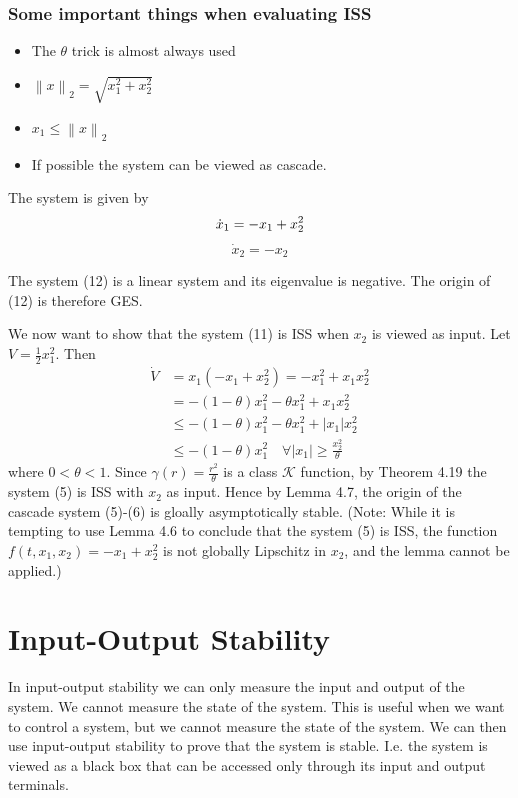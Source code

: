 \documentclass{article}
\begin{document}
\subsubsection{Some important things when evaluating ISS}
\begin{itemize}
	\item The $\theta $ trick is almost always used
	\item $\left\| x \right\|_2 = \sqrt{x_1^{2}+x_2^{2}}$
	\item $x_1 \leq \left\| x \right\|_2$
	\item If possible the system can be viewed as cascade.
\end{itemize}
\begin{frm-ex}
The system is given by
\begin{equation}
	\dot{x}_1=-x_1+x_2^2\\
\end{equation}
\begin{equation}
	\dot{x}_2=-x_2 
\end{equation}

The system (12) is a linear system and its eigenvalue is negative. The origin of (12) is therefore GES.

We now want to show that the system (11) is ISS when $x_2$ is viewed as input. Let $V=\frac{1}{2} x_1^2$. Then
$$
	\begin{aligned}
		\dot{V} & =x_1\left(-x_1+x_2^2\right)=-x_1^2+x_1 x_2^2                                  \\
		        & =-(1-\theta) x_1^2-\theta x_1^2+x_1 x_2^2                                     \\
		        & \leq-(1-\theta) x_1^2-\theta x_1^2+\left|x_1\right| x_2^2                     \\
		        & \leq-(1-\theta) x_1^2 \quad \forall\left|x_1\right| \geq \frac{x_2^2}{\theta}
	\end{aligned}
$$
where $0<\theta<1$. Since $\gamma(r)=\frac{r^2}{\theta}$ is a class $\mathcal{K}$ function, by Theorem 4.19 the system (5) is ISS with $x_2$ as input. Hence by Lemma 4.7, the origin of the cascade system (5)-(6) is gloally asymptotically stable.
(Note: While it is tempting to use Lemma 4.6 to conclude that the system (5) is ISS, the function $f\left(t, x_1, x_2\right)=-x_1+x_2^2$ is not globally Lipschitz in $x_2$, and the lemma cannot be applied.)
\end{frm-ex}
\section{Input-Output Stability}
In input-output stability we can only measure the input and output of the system. We cannot measure the state of the system. This is useful when we want to control a system, but we cannot measure the state of the system. We can then use input-output stability to prove that the system is stable. I.e. the system is viewed as a black box that can be accessed only through its input and output terminals.
\end{document}
